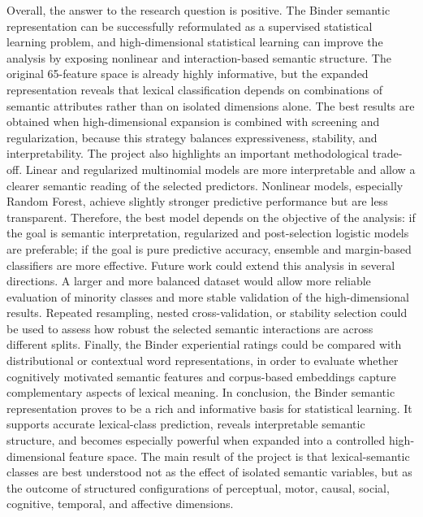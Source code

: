 \documentclass{ipgpmaster}
\begin{document}
Overall, the answer to the research question is positive. The Binder semantic representation can be successfully reformulated as a supervised statistical learning problem, and high-dimensional statistical learning can improve the analysis by exposing nonlinear and interaction-based semantic structure. The original 65-feature space is already highly informative, but the expanded representation reveals that lexical classification depends on combinations of semantic attributes rather than on isolated dimensions alone. The best results are obtained when high-dimensional expansion is combined with screening and regularization, because this strategy balances expressiveness, stability, and interpretability.
The project also highlights an important methodological trade-off. Linear and regularized multinomial models are more interpretable and allow a clearer semantic reading of the selected predictors. Nonlinear models, especially Random Forest, achieve slightly stronger predictive performance but are less transparent. Therefore, the best model depends on the objective of the analysis: if the goal is semantic interpretation, regularized and post-selection logistic models are preferable; if the goal is pure predictive accuracy, ensemble and margin-based classifiers are more effective.
Future work could extend this analysis in several directions. A larger and more balanced dataset would allow more reliable evaluation of minority classes and more stable validation of the high-dimensional results. Repeated resampling, nested cross-validation, or stability selection could be used to assess how robust the selected semantic interactions are across different splits. Finally, the Binder experiential ratings could be compared with distributional or contextual word representations, in order to evaluate whether cognitively motivated semantic features and corpus-based embeddings capture complementary aspects of lexical meaning.
In conclusion, the Binder semantic representation proves to be a rich and informative basis for statistical learning. It supports accurate lexical-class prediction, reveals interpretable semantic structure, and becomes especially powerful when expanded into a controlled high-dimensional feature space. The main result of the project is that lexical-semantic classes are best understood not as the effect of isolated semantic variables, but as the outcome of structured configurations of perceptual, motor, causal, social, cognitive, temporal, and affective dimensions.
\newpage

\printbibliography
\end{document}
